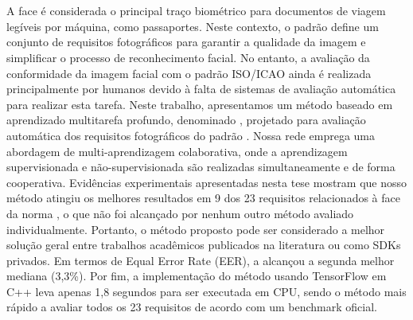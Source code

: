 \section*{}

A face é considerada o principal traço biométrico para documentos de viagem legíveis por máquina, como passaportes. Neste contexto, o padrão \icao define um conjunto de requisitos fotográficos para garantir a qualidade da imagem e simplificar o processo de reconhecimento facial. No entanto, a avaliação da conformidade da imagem facial com o padrão ISO/ICAO ainda é realizada principalmente por humanos devido à falta de sistemas de avaliação automática para realizar esta tarefa. Neste trabalho, apresentamos um método baseado em aprendizado multitarefa profundo, denominado \methodname, projetado para avaliação automática dos requisitos fotográficos do padrão \icao. Nossa rede emprega uma abordagem de multi-aprendizagem colaborativa, onde a aprendizagem supervisionada e não-supervisionada são realizadas simultaneamente e de forma cooperativa. Evidências experimentais apresentadas nesta tese mostram que nosso método atingiu os melhores resultados em 9 dos 23 requisitos relacionados à face da norma \icao, o que não foi alcançado por nenhum outro método avaliado individualmente. Portanto, o método proposto pode ser considerado a melhor solução geral entre trabalhos acadêmicos publicados na literatura ou como SDKs privados. Em termos de Equal Error Rate (EER), a \methodname alcançou a segunda melhor mediana (3,3\%). Por fim, a implementação do método usando TensorFlow em C++ leva apenas 1,8 segundos para ser executada em CPU, sendo o método mais rápido a avaliar todos os 23 requisitos de acordo com um benchmark oficial.

\newpage
